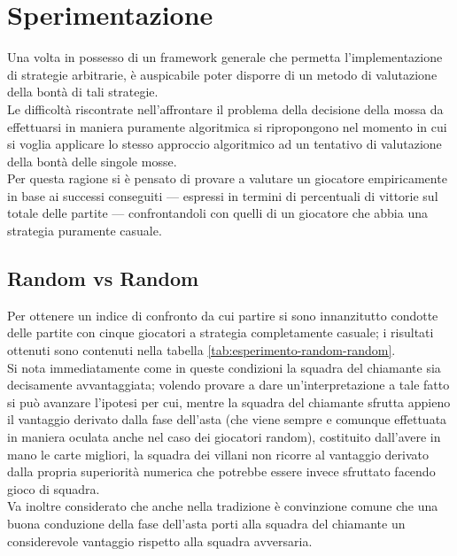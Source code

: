 \chapter*{Sperimentazione}
\graphicspath{{Chapter6/Chapter6Figs/PNG/}{Chapter6/Chapter6Figs/PDF/}{Chapter6/Chapter6Figs/}}

Una volta in possesso di un framework generale che permetta l'implementazione di strategie arbitrarie, è auspicabile poter disporre di un metodo di valutazione della bontà di tali strategie.\\
Le difficoltà riscontrate nell'affrontare il problema della decisione della mossa da effettuarsi in maniera puramente algoritmica si ripropongono nel momento in cui si voglia applicare lo stesso approccio algoritmico ad un tentativo di valutazione della bontà delle singole mosse.\\
Per questa ragione si è pensato di provare a valutare un giocatore empiricamente in base ai successi conseguiti --- espressi in termini di percentuali di vittorie sul totale delle partite ---  confrontandoli con quelli di un giocatore che abbia una strategia puramente casuale.


\section{Random vs Random}

Per ottenere un indice di confronto da cui partire si sono innanzitutto condotte delle partite con cinque giocatori a strategia completamente casuale; i risultati ottenuti sono contenuti nella tabella \ref{tab:esperimento-random-random}.\\
Si nota immediatamente come in queste condizioni la squadra del chiamante sia decisamente avvantaggiata; volendo provare a dare un'interpretazione a tale fatto si può avanzare l'ipotesi per cui, mentre la squadra del chiamante sfrutta appieno il vantaggio derivato dalla fase dell'asta (che viene sempre e comunque effettuata in maniera oculata anche nel caso dei giocatori random), costituito dall'avere in mano le carte migliori, la squadra dei villani non ricorre al vantaggio derivato dalla propria superiorità numerica che potrebbe essere invece sfruttato facendo gioco di squadra.\\
Va inoltre considerato che anche nella tradizione è convinzione comune che una buona conduzione della fase dell'asta porti alla squadra del chiamante un considerevole vantaggio rispetto alla squadra avversaria.

